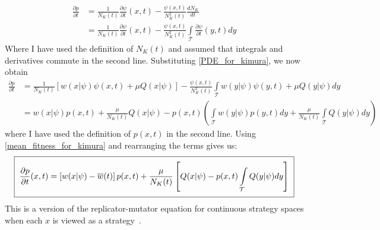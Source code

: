\begin{align*}
\frac{\partial p}{\partial t} &= \frac{1}{N_K(t)}\frac{\partial \psi}{\partial t}(x,t) - \frac{\psi(x,t)}{N^2_K(t)}\frac{d N_K}{dt}\\
&= \frac{1}{N_K(t)}\frac{\partial \psi}{\partial t}(x,t) - \frac{\psi(x,t)}{N^2_K(t)}\int\limits_{\mathcal{T}}\frac{\partial \psi}{\partial t}(y,t)dy
\end{align*}
Where I have used the definition of $N_K(t)$ and assumed that integrals and derivatives commute in the second line. Substituting \eqref{PDE_for_kimura}, we now obtain
\begin{align*}
\frac{\partial p}{\partial t} &= \frac{1}{N_K(t)}\left[w(x|\psi)\psi(x,t) + \mu Q(x|\psi)\right] - \frac{\psi(x,t)}{N^2_K(t)}\int\limits_{\mathcal{T}}w(y|\psi)\psi(y,t) + \mu Q(y|\psi)dy\\
&= w(x|\psi)p(x,t) + \frac{\mu}{N_{K}(t)} Q(x|\psi) - p(x,t)\left(\int\limits_{\mathcal{T}}w(y|\psi)p(y,t)dy+\frac{\mu}{N_K(t)}\int\limits_{\mathcal{T}} Q(y|\psi)dy\right)
\end{align*}
where I have used the definition of $p(x,t)$ in the second line. Using \eqref{mean_fitness_for_kimura} and rearranging the terms gives us:
\begin{equation}
\label{cts_replicator_mutator}
\setlength{\fboxsep}{2\fboxsep}\boxed{\frac{\partial p}{\partial t}(x,t) = \left[w(x|\psi) - \overline{w}(t)\right]p(x,t)+\frac{\mu}{N_K(t)}\left[Q(x|\psi) - p(x,t)\int\limits_{\mathcal{T}} Q(y|\psi)dy\right]}
\end{equation}
This is a version of the replicator-mutator equation for continuous strategy spaces when each $x$ is viewed as a strategy~\citep{cressman_replicator_2014}.

